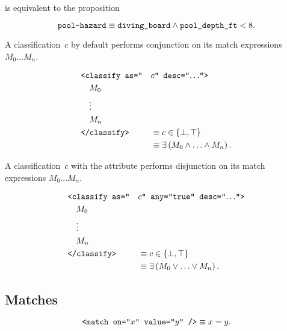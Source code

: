 \noindent
is equivalent to the proposition

\begin{equation*}
  \texttt{pool-hazard} \equiv \texttt{diving\_board}
    \wedge \texttt{pool\_depth\_ft} < 8.
\end{equation*}

\begin{definition}
  A classification~$c$ by default performs \gls{conjunction} on its match
    expressions $M_0\ldots M_n$.

  \begin{alignat*}{2}
    &\texttt{<classify as="}&&c\texttt{" desc="$\ldots$">} \\
    &\quad M_0 \\
    &\quad \vdots \\
    &\quad M_n \\
    &\texttt{</classify>}
      &&\equiv c\in\{\bot,\top\} \\
    & &&\equiv \exists\left( M_0 \wedge \ldots \wedge M_n \right).
  \end{alignat*}
\end{definition}

\begin{definition}
  A classification~$c$ with the attribute  performs
    \gls{disjunction} on its match expressions $M_0\ldots M_n$.

  \begin{alignat*}{2}
    &\texttt{<classify as="} &&c\texttt{" any="true" desc="$\ldots$">} \\
    &\quad M_0 \\
    &\quad \vdots \\
    &\quad M_n \\
    &\texttt{</classify>}
      &&\equiv c\in\{\bot,\top\} \\
    & &&\equiv \exists\left( M_0 \vee \ldots \vee M_n \right).
  \end{alignat*}
\end{definition}


\subsection{Matches}
\begin{definition}
  \begin{equation*}
    \texttt{<match on="$x$" value="$y$" />} \equiv x = y.
  \end{equation*}
\end{definition}

